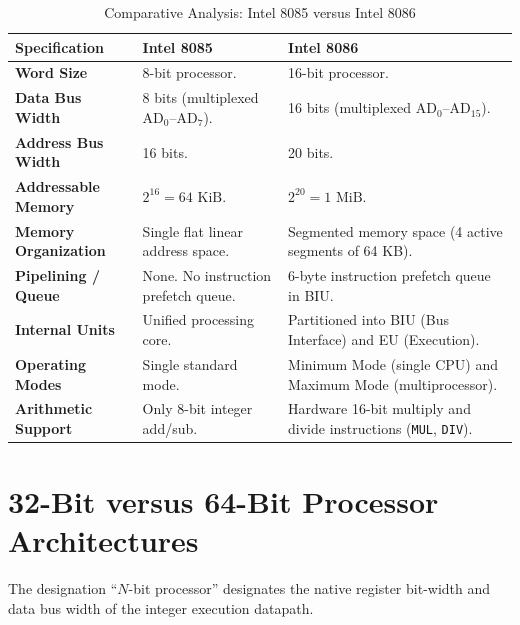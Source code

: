 \begin{table}[htbp]
\centering
\small
\caption{Comparative Analysis: Intel 8085 versus Intel 8086}
\label{tab:8085_vs_8086}
\begin{tabularx}{\textwidth}{l X X}
\toprule
\textbf{Specification} & \textbf{Intel 8085} & \textbf{Intel 8086} \\
\midrule
\textbf{Word Size} & 8-bit processor. & 16-bit processor. \\
\textbf{Data Bus Width} & 8 bits (multiplexed $\text{AD}_0$--$\text{AD}_7$). & 16 bits (multiplexed $\text{AD}_0$--$\text{AD}_{15}$). \\
\textbf{Address Bus Width} & 16 bits. & 20 bits. \\
\textbf{Addressable Memory} & $2^{16} = 64\text{ KiB}$. & $2^{20} = 1\text{ MiB}$. \\
\textbf{Memory Organization} & Single flat linear address space. & Segmented memory space (4 active segments of 64 KB). \\
\textbf{Pipelining / Queue} & None. No instruction prefetch queue. & 6-byte instruction prefetch queue in BIU. \\
\textbf{Internal Units} & Unified processing core. & Partitioned into BIU (Bus Interface) and EU (Execution). \\
\textbf{Operating Modes} & Single standard mode. & Minimum Mode (single CPU) and Maximum Mode (multiprocessor). \\
\textbf{Arithmetic Support} & Only 8-bit integer add/sub. & Hardware 16-bit multiply and divide instructions (\texttt{MUL}, \texttt{DIV}). \\
\bottomrule
\end{tabularx}
\end{table}


\section{32-Bit versus 64-Bit Processor Architectures}
\label{sec:32bit_vs_64bit}

The designation ``$N$-bit processor'' designates the native register bit-width and data bus width of the integer execution datapath.

